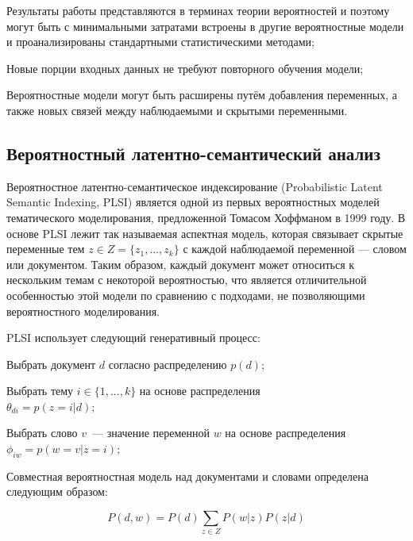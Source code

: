 \begin{itemize*}
\item Результаты работы представляются в терминах теории вероятностей и поэтому могут быть с минимальными затратами встроены в другие вероятностные модели и проанализированы стандартными статистическими методами; 
\item Новые порции входных данных не требуют повторного обучения модели; 
\item Вероятностные модели могут быть расширены путём добавления переменных, а также новых связей между наблюдаемыми и скрытыми переменными.
\end{itemize*}

\subsection{Вероятностный латентно-семантический анализ}


Вероятностное латентно-семантическое индексирование (Probabilistic Latent Semantic Indexing, PLSI) является одной из первых вероятностных моделей тематического моделирования, предложенной Томасом Хоффманом в 1999 году. 
В основе PLSI лежит так называемая аспектная модель, которая связывает скрытые переменные тем $z\in Z=\{z_1,...,z_k\}$ с каждой наблюдаемой переменной — словом или документом. Таким образом, каждый документ может относиться к нескольким темам с некоторой вероятностью, что является отличительной особенностью этой модели по сравнению с подходами, не позволяющими вероятностного моделирования. 

PLSI использует следующий генеративный процесс: 

\begin{enumerate*}
\item Выбрать документ $d$ согласно распределению $p(d)$;
\item Выбрать тему $i\in \{1,...,k\}$ на основе распределения \\ \mbox{$\theta_{di}=p(z=i|d)$};
\item Выбрать слово $v$~--- значение переменной $w$ на основе распределения $\phi_{iw}=p(w=v|z=i)$;
\end{enumerate*}

Совместная вероятностная модель над документами и словами определена следующим образом:

\begin{equation}\label{}
P(d,w)=P(d)\sum_{z\in Z}P(w|z)P(z|d)
\end{equation}

